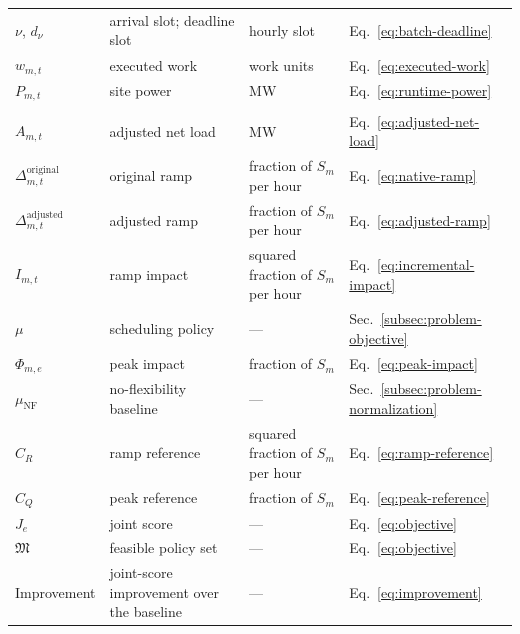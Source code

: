 \documentclass{UNCC-thesis}
\begin{document}
\begin{longtable}{@{}L{0.15\textwidth}L{0.37\textwidth}L{0.25\textwidth}L{0.13\textwidth}@{}}
  \(\nu\), \(d_\nu\) & arrival slot; deadline slot & hourly slot & Eq.~\eqref{eq:batch-deadline} \\
  \(w_{m,t}\) & executed work & work units & Eq.~\eqref{eq:executed-work} \\
  \(P_{m,t}\) & site power & MW & Eq.~\eqref{eq:runtime-power} \\
  \addlinespace
   \\
  \(A_{m,t}\) & adjusted net load & MW & Eq.~\eqref{eq:adjusted-net-load} \\
  \(\Delta^{\mathrm{original}}_{m,t}\) & original ramp & fraction of \(S_m\) per hour & Eq.~\eqref{eq:native-ramp} \\
  \(\Delta^{\mathrm{adjusted}}_{m,t}\) & adjusted ramp & fraction of \(S_m\) per hour & Eq.~\eqref{eq:adjusted-ramp} \\
  \(I_{m,t}\) & ramp impact & squared fraction of \(S_m\) per hour & Eq.~\eqref{eq:incremental-impact} \\
  \(\mu\) & scheduling policy & --- & Sec.~\ref{subsec:problem-objective} \\
  \(\Phi_{m,e}\) & peak impact & fraction of \(S_m\) & Eq.~\eqref{eq:peak-impact} \\
  \(\mu_{\mathrm{NF}}\) & no-flexibility baseline & --- & Sec.~\ref{subsec:problem-normalization} \\
  \(C_R\) & ramp reference & squared fraction of \(S_m\) per hour & Eq.~\eqref{eq:ramp-reference} \\
  \(C_Q\) & peak reference & fraction of \(S_m\) & Eq.~\eqref{eq:peak-reference} \\
  \(J_e\) & joint score & --- & Eq.~\eqref{eq:objective} \\
  \(\mathfrak M\) & feasible policy set & --- & Eq.~\eqref{eq:objective} \\
  Improvement & joint-score improvement over the baseline & --- & Eq.~\eqref{eq:improvement} \\
  \bottomrule
\end{longtable}
\endgroup
\end{document}
